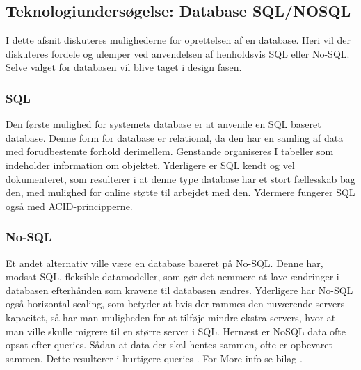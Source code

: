 \subsection{Teknologiundersøgelse: Database SQL/NOSQL
}
I dette afsnit diskuteres mulighederne for oprettelsen af en database. Heri vil der diskuteres fordele og ulemper ved anvendelsen af henholdsvis SQL eller No-SQL. Selve valget for databasen vil blive taget i design fasen.


\subsubsection{SQL}
Den første mulighed for systemets database er at anvende en SQL baseret database. Denne form for database
er relational, da den har en samling af data med forudbestemte forhold derimellem. Genstande
organiseres I tabeller som indeholder information om objektet. Yderligere er SQL kendt og vel
dokumenteret, som resulterer i at denne type database har et stort fællesskab bag den, med mulighed for online støtte til arbejdet med den. Ydermere fungerer SQL også med ACID-principperne.
\cite{Yalantis} \cite{IBM} 
\subsubsection{No-SQL}
Et andet alternativ ville være en database baseret på No-SQL. Denne har, modsat SQL, fleksible
datamodeller, som gør det nemmere at lave ændringer i databasen efterhånden som kravene til
databasen ændres. Yderligere har No-SQL også horizontal scaling, som betyder at hvis der rammes
den nuværende servers kapacitet, så har man muligheden for at tilføje mindre ekstra servers, hvor at man ville skulle migrere til en større server i SQL. Hernæst er NoSQL data ofte opsat efter queries. Sådan at data der skal hentes sammen,
ofte er opbevaret sammen. Dette resulterer i hurtigere queries \cite{MongoDB.com}. For More info se bilag \parencite[][Section 7.2]{TekniskBilag}.
